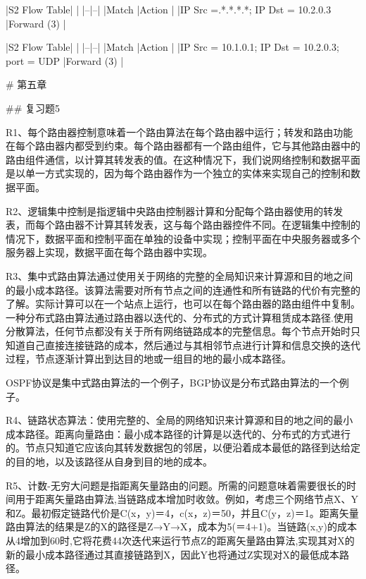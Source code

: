 \documentclass[11pt,UTF8,twoside]{article}
\begin{document}
	
	|S2 Flow Table| |
	|--|--|
	|Match |Action |
	|IP Src =.*.*.*.*; IP Dst = 10.2.0.3 |Forward (3) |
	
	|S2 Flow Table| |
	|--|--|
	|Match |Action |
	|IP Src = 10.1.0.1; IP Dst = 10.2.0.3; port = UDP |Forward (3) |
	
		\newpage
	\pagestyle{fancy}
	\fancyhf{}  %
	\pagestyle{fancy}
	
	# 第五章
	
	## 复习题5
	
	R1、每个路由器控制意味着一个路由算法在每个路由器中运行；转发和路由功能在每个路由器内都受到约束。每个路由器都有一个路由组件，它与其他路由器中的路由组件通信，以计算其转发表的值。在这种情况下，我们说网络控制和数据平面是以单一方式实现的，因为每个路由器作为一个独立的实体来实现自己的控制和数据平面。
	
	R2、逻辑集中控制是指逻辑中央路由控制器计算和分配每个路由器使用的转发表，而每个路由器不计算其转发表，这与每个路由器控件不同。在逻辑集中控制的情况下，数据平面和控制平面在单独的设备中实现；控制平面在中央服务器或多个服务器上实现，数据平面在每个路由器中实现。
	
	R3、集中式路由算法通过使用关于网络的完整的全局知识来计算源和目的地之间的最小成本路径。该算法需要对所有节点之间的连通性和所有链路的代价有完整的了解。实际计算可以在一个站点上运行，也可以在每个路由器的路由组件中复制。一种分布式路由算法通过路由器以迭代的、分布式的方式计算租赁成本路径.使用分散算法，任何节点都没有关于所有网络链路成本的完整信息。每个节点开始时只知道自己直接连接链路的成本，然后通过与其相邻节点进行计算和信息交换的迭代过程，节点逐渐计算出到达目的地或一组目的地的最小成本路径。
	
	OSPF协议是集中式路由算法的一个例子，BGP协议是分布式路由算法的一个例子。
	
	R4、链路状态算法：使用完整的、全局的网络知识来计算源和目的地之间的最小成本路径。距离向量路由：最小成本路径的计算是以迭代的、分布式的方式进行的。节点只知道它应该向其转发数据包的邻居，以便沿着成本最低的路径到达给定的目的地，以及该路径从自身到目的地的成本。
	
	R5、计数-无穷大问题是指距离矢量路由的问题。所需的问题意味着需要很长的时间用于距离矢量路由算法,当链路成本增加时收敛。例如，考虑三个网络节点X、Y和Z。最初假定链路代价是C(x，y)＝4，c(x，z)＝50，并且C(y，z)＝1。距离矢量路由算法的结果是Z的X的路径是Z→Y→X，成本为5(＝4+1)。当链路(x,y)的成本从4增加到60时,它将花费44次迭代来运行节点Z的距离矢量路由算法,实现其对X的新的最小成本路径通过其直接链路到X，因此Y也将通过Z实现对X的最低成本路径。
	
\end{document}

